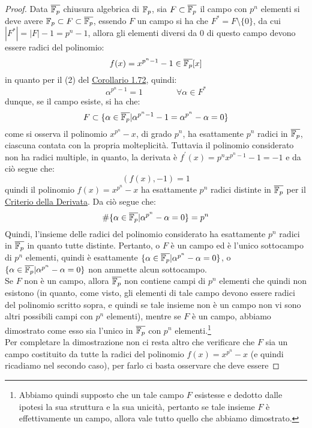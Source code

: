 \documentclass[11pt]{scrartcl}
\begin{document}
\begin{proof}
	Data $\overline {{\mathbb F}_p}$ chiusura algebrica di ${\mathbb F}_p$, sia $F \subset \overline{{\mathbb F}_p}$ il campo con $p^n$ elementi
	si deve avere ${\mathbb F}_p \subset F \subset \overline{{\mathbb F}_p}$, essendo $F$ un campo si ha che $F^* = F \setminus \{0\}$,
	da cui $|F^*| = |F| - 1 = p^n - 1$, allora gli elementi diversi da $0$ di questo campo devono essere
	radici del polinomio:
		\[ f(x) = x^{p^{n}-1}-1 \in \overline{{\mathbb F}_p}[x]
			\]
	in quanto per il (2) del \hyperref[g:OrdLagrange]{Corollario 1.72}, quindi:
		\[ \alpha^{p^n-1} = 1
		\qquad\qquad \forall \alpha \in F^*
			\]
	dunque, se il campo esiste, si ha che:
		\[ F \subset \{\alpha \in \overline{{\mathbb F}_p} | \alpha^{p^n-1} - 1 = \alpha^{p^n} - \alpha = 0\}
			\]
	come si osserva il polinomio $ x^{p^n}-x$, di grado $p^n$, ha esattamente 
	$p^n$ radici in $\overline{{\mathbb F}_p}$, ciascuna contata con la propria molteplicità. Tuttavia il polinomio considerato non
	ha radici multiple, in quanto, la derivata è $f^{\prime}(x) = p^nx^{p^n-1} - 1 = -1$ e da ciò segue che:
		\[ (f(x), -1) = 1
			\]
	quindi il polinomio $f(x) = x^{p^n}-x$ ha esattamente $p^n$ radici distinte in $\overline{{\mathbb F}_p}$ per il \hyperref[p:der]{Criterio della Derivata}. Da ciò segue che:
		\[ \#\{\alpha \in \overline{{\mathbb F}_p} | \alpha^{p^n} - \alpha = 0\} = p^n
		\]
	Quindi, l'insieme delle radici del polinomio considerato ha esattamente $p^n$ radici in $\overline{{\mathbb F}_p}$ in quanto tutte distinte.
	Pertanto, o $F$ è un campo ed è l'unico sottocampo di $p^n$ elementi, quindi è esattamente $\{\alpha \in \overline{{\mathbb F}_p} |\alpha^{p^n} - \alpha = 0\}$, 
	o $\{\alpha \in \overline{{\mathbb F}_p} |\alpha^{p^n} - \alpha = 0\}$ non ammette alcun sottocampo.\\
	 Se $F$ non è un campo, allora $\overline{{\mathbb F}_p}$ non contiene campi di $p^n$ elementi che quindi non esistono (in quanto, come visto, gli elementi di tale campo devono essere
	 radici del polinomio scritto sopra, e quindi se tale insieme non è un campo non vi sono altri possibili campi con $p^{n}$ elementi), mentre se $F$ è un campo, abbiamo dimostrato
	come esso sia l'unico in $\overline{{\mathbb F}_p}$ con $p^n$ elementi.\footnote{Abbiamo quindi supposto che un tale campo $F$ esistesse e dedotto
	 dalle ipotesi la sua struttura e la sua unicità, pertanto se tale insieme $F$ è effettivamente un campo, allora vale tutto quello che
	 abbiamo dimostrato.}\\
	Per completare la dimostrazione non ci resta altro che verificare che $F$ sia un campo costituito da tutte la radici 
	del polinomio $f(x) = x^{p^n}-x$ (e quindi ricadiamo nel secondo caso), per farlo ci basta osservare che deve essere

\end{proof}
\end{document}
